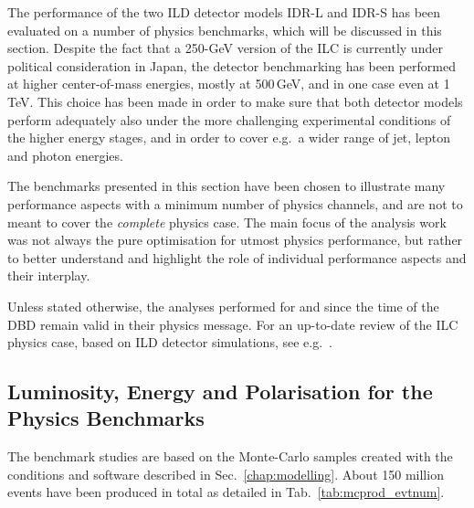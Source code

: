 

The performance of the two ILD detector models IDR-L and IDR-S has been
evaluated on a number of physics benchmarks, which will be discussed in this section. 
Despite the fact that a 250-GeV version of the ILC is currently under political consideration in Japan, the detector benchmarking has been performed at higher center-of-mass energies, mostly at 500\,GeV, and in one case even at 1\,TeV. This choice has been made in order to make sure that both detector models perform adequately also under the more challenging experimental conditions of the higher energy stages, and in order to cover e.g.\ a wider range of jet, lepton and photon energies.

The benchmarks presented in this section have been chosen to illustrate many performance aspects with a minimum number of physics channels, and are not to meant to cover the {\em complete} physics case. The main focus of the analysis work was not always the pure optimisation for utmost physics performance, but rather to better understand and highlight the role of individual performance aspects and their interplay.

Unless stated otherwise, the analyses performed for and since the time of the DBD remain valid in their physics message. For an up-to-date review of the ILC physics case, based on ILD detector simulations, see e.g.~\cite{Bambade:2019fyw}.

\subsection{Luminosity, Energy and Polarisation for the Physics Benchmarks}
\label{sec:benchmarks:lep}
The benchmark studies are based on the Monte-Carlo samples created with the conditions and software described in Sec.~\ref{chap:modelling}. About 150 million events have been produced in total as detailed in Tab.~\ref{tab:mcprod_evtnum}. 

